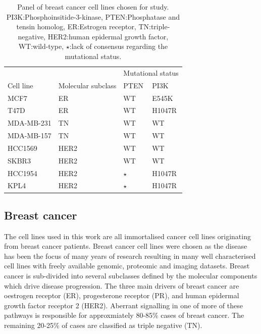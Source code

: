 \documentclass[a4paper,11pt,twoside,openright]{scrbook}
\begin{document}
\begin{table}[]
    \begin{footnotesize}
    \captionsetup{width=0.8\linewidth}
    \centering
    \caption[Panel of breast cancer cell lines chosen for study]{Panel of breast cancer cell lines chosen for study. PI3K:Phosphoinsitide-3-kinase, PTEN:Phosphatase and tensin homolog, ER:Estrogen receptor, TN:triple-negative, HER2:human epidermal growth factor, WT:wild-type, $\star$:lack of consensus regarding the mutational status.}
    \label{table:cell-lines}
    \begin{tabular}{@{}llll@{}}
    \toprule
               &                    & \multicolumn{2}{l}{Mutational status} \\
    Cell line  & Molecular subclass & PTEN             & PI3K               \\ \midrule
    MCF7       & ER                 & WT               & E545K              \\
    T47D       & ER                 & WT               & H1047R             \\
    MDA-MB-231 & TN                 & WT               & WT                 \\
    MDA-MB-157 & TN                 & WT               & WT                 \\
    HCC1569    & HER2               & WT               & WT                 \\
    SKBR3      & HER2               & WT               & WT                 \\
    HCC1954    & HER2               & $\star$          & H1047R             \\
    KPL4       & HER2               & $\star$          & H1047R             \\ \bottomrule
    \end{tabular}
    \end{footnotesize}
\end{table}


\subsection{Breast cancer}
The cell lines used in this work are all immortalised cancer cell lines originating from breast cancer patients.
Breast cancer cell lines were chosen as the disease has been the focus of many years of research resulting in many well characterised cell lines with freely available genomic, proteomic and imaging datasets.
Breast cancer is sub-divided into several subclasses defined by the molecular components which drive disease progression.
The three main drivers of breast cancer are oestrogen receptor (ER), progesterone receptor (PR), and human epidermal growth factor receptor 2 (HER2).
Aberrant signalling in one of more of these pathways is responsible for approxmiately 80-85\% cases of breast cancer.
The remaining 20-25\% of cases are classified as triple negative (TN).
\end{document}
